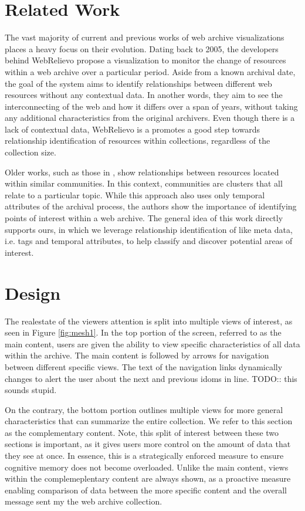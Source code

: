 \documentclass[10pt,journal,compsoc]{IEEEtran}
\begin{document}
\section{Related Work}
The vast majority of current and previous works of web archive visualizations places a heavy focus on their evolution. Dating back to 2005, the developers behind WebRelievo \cite{toyoda2005system} propose a visualization to monitor the change of resources within a web archive over a particular period. Aside from a known archival date, the goal of the system aims to identify relationships between different web resources without any contextual data. In another words, they aim to see the interconnecting of the web and how it differs over a span of years, without taking any additional characteristics from the original archivers. Even though there is a lack of contextual data, WebRelievo is a promotes a good step towards relationship identification of resources within collections, regardless of the collection size. \par

Older works, such as those in \cite{toyoda2003extracting}, show relationships between resources located within similar communities. In this context, communities are clusters that all relate to a particular topic. While this approach also uses only temporal attributes of the archival process, the authors show the importance of identifying points of interest within a web archive. The general idea of this work directly supports ours, in which we leverage relationship identification of like meta data, i.e. tags and temporal attributes, to help classify and discover potential areas of interest. \par


\section{Design}
The realestate of the viewers attention is split into multiple views of interest, as seen in Figure \ref{fig:mesh1}. In the top portion of the screen, referred to as the main content, users are given the ability to view specific characteristics of all data within the archive. The main content is followed by arrows for navigation between different specific views. The text of the navigation links dynamically changes to alert the user about the next and previous idoms in line. TODO:: this sounds stupid. \par

On the contrary, the bottom portion outlines multiple views for more general characteristics that can summarize the entire collection. We refer to this section as the complementary content. Note, this split of interest between these two sections is important, as it gives users more control on the amount of data that they see at once. In essence, this is a strategically enforced measure to ensure cognitive memory does not become overloaded. Unlike the main content, views within the complemeplentary content are always shown, as a proactive measure enabling comparison of data between the more specific content and the overall message sent my the web archive collection. \par
\end{document}
